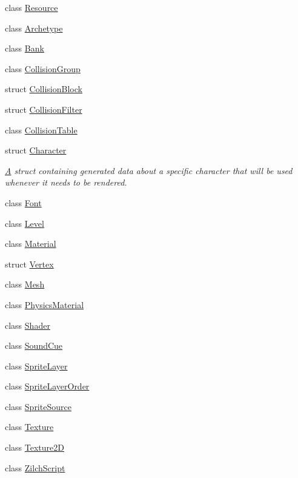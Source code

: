 \begin{DoxyCompactItemize}
\item 
class \hyperlink{classDCEngine_1_1Resource}{Resource}
\item 
class \hyperlink{classDCEngine_1_1Archetype}{Archetype}
\item 
class \hyperlink{classDCEngine_1_1Bank}{Bank}
\item 
class \hyperlink{classDCEngine_1_1CollisionGroup}{Collision\-Group}
\item 
struct \hyperlink{structDCEngine_1_1CollisionBlock}{Collision\-Block}
\item 
struct \hyperlink{structDCEngine_1_1CollisionFilter}{Collision\-Filter}
\item 
class \hyperlink{classDCEngine_1_1CollisionTable}{Collision\-Table}
\item 
struct \hyperlink{structDCEngine_1_1Character}{Character}
\begin{DoxyCompactList}\small\item\em \hyperlink{classA}{A} struct containing generated data about a specific character that will be used whenever it needs to be rendered. \end{DoxyCompactList}\item 
class \hyperlink{classDCEngine_1_1Font}{Font}
\item 
class \hyperlink{classDCEngine_1_1Level}{Level}
\item 
class \hyperlink{classDCEngine_1_1Material}{Material}
\item 
struct \hyperlink{structDCEngine_1_1Vertex}{Vertex}
\item 
class \hyperlink{classDCEngine_1_1Mesh}{Mesh}
\item 
class \hyperlink{classDCEngine_1_1PhysicsMaterial}{Physics\-Material}
\item 
class \hyperlink{classDCEngine_1_1Shader}{Shader}
\item 
class \hyperlink{classDCEngine_1_1SoundCue}{Sound\-Cue}
\item 
class \hyperlink{classDCEngine_1_1SpriteLayer}{Sprite\-Layer}
\item 
class \hyperlink{classDCEngine_1_1SpriteLayerOrder}{Sprite\-Layer\-Order}
\item 
class \hyperlink{classDCEngine_1_1SpriteSource}{Sprite\-Source}
\item 
class \hyperlink{classDCEngine_1_1Texture}{Texture}
\item 
class \hyperlink{classDCEngine_1_1Texture2D}{Texture2\-D}
\item 
class \hyperlink{classDCEngine_1_1ZilchScript}{Zilch\-Script}

\end{DoxyCompactItemize}
